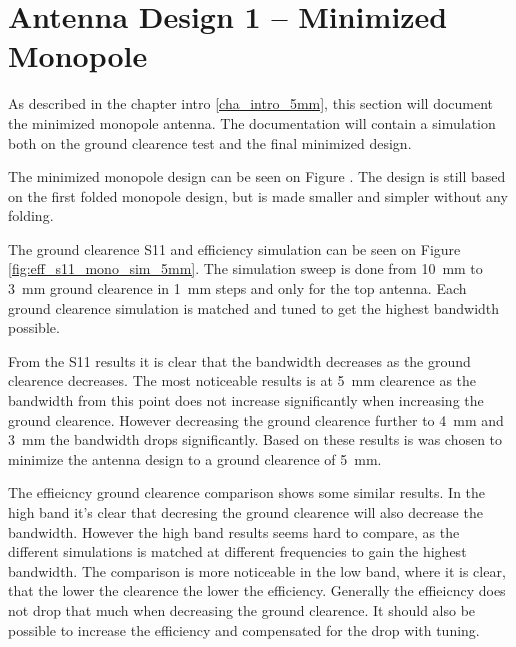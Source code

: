 \section{Antenna Design 1 -- Minimized Monopole}
\label{sec:techsol1_monopole_5mm}
\begin{aautop}
As described in the chapter intro \ref{cha_intro_5mm}, this section will document the minimized monopole antenna. The documentation will contain a simulation both on the ground clearence test and the final minimized design.      
\end{aautop}

The minimized monopole design can be seen on Figure . The design is still based on the first folded monopole design, but is made smaller and simpler without any folding.

The ground clearence S11 and efficiency simulation can be seen on Figure \ref{fig:eff_s11_mono_sim_5mm}.
The simulation sweep is done from \SI{10}{mm} to \SI{3}{mm} ground clearence in \SI{1}{mm} steps and only for the top antenna. Each ground clearence simulation is matched and tuned to get the highest bandwidth possible.

From the S11 results it is clear that the bandwidth decreases as the ground clearence decreases. The most noticeable results is at \SI{5}{mm} clearence as the bandwidth from this point does not increase significantly when increasing the ground clearence. However decreasing the ground clearence further to \SI{4}{mm} and \SI{3}{mm} the bandwidth drops significantly. Based on these results is was chosen to minimize the antenna design to a ground clearence of \SI{5}{mm}.

The effieicncy ground clearence comparison shows some similar results. In the high band it's clear that decresing the ground clearence will also decrease the bandwidth. However the high band results seems hard to compare, as the different simulations is matched at different frequencies to gain the highest bandwidth. The comparison is more noticeable in the low band, where it is clear, that the lower the clearence the lower the efficiency. Generally the effieicncy does not drop that much when decreasing the ground clearence. It should also be possible to increase the efficiency and compensated for the drop with tuning.  

